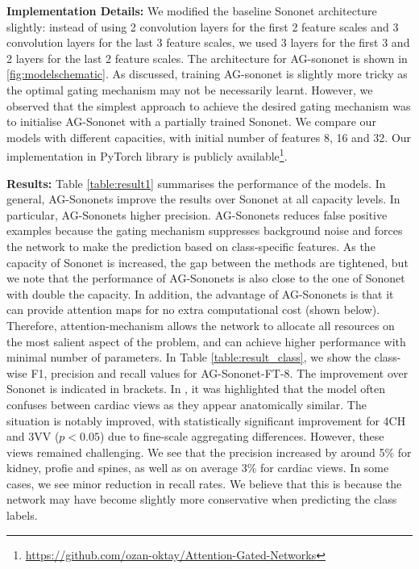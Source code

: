 \documentclass{article}
\begin{document}
\textbf{Implementation Details:} We modified the baseline Sononet architecture slightly: instead of using 2 convolution layers for the first 2 feature scales and 3 convolution layers for the last 3 feature scales, we used 3 layers for the first 3 and 2 layers for the last 2 feature scales. The architecture for AG-sononet is shown in \ref{fig:modelschematic}. As discussed, training AG-sononet is slightly more tricky as the optimal gating mechanism may not be necessarily learnt. However, we observed that the simplest approach to achieve the desired gating mechanism was to initialise AG-Sononet with a partially trained Sononet. We compare our models with different capacities, with initial number of features 8, 16 and 32. Our implementation in PyTorch library is publicly available\footnote{\url{https://github.com/ozan-oktay/Attention-Gated-Networks}}.

\textbf{Results:} Table \ref{table:result1} summarises the performance of the models. In general, AG-Sononets improve the results over Sononet at all capacity levels. In particular, AG-Sononets higher precision. AG-Sononets reduces false positive examples because the gating mechanism suppresses background noise and forces the network to make the prediction based on class-specific features.  As the capacity of Sononet is increased, the gap between the methods are tightened, but we note that the performance of AG-Sononets is also close to the one of Sononet with double the capacity. In addition, the advantage of AG-Sononets is that it can provide attention maps for no extra computational cost (shown below). Therefore, attention-mechanism allows the network to allocate all resources on the most salient aspect of the problem, and can achieve higher performance with minimal number of parameters. In Table \ref{table:result_class}, we show the class-wise F1, precision and recall values for AG-Sononet-FT-8. The improvement over Sononet is indicated in brackets. In \cite{baumgartner2016real}, it was highlighted that the model often confuses between cardiac views as they appear anatomically similar. The situation is notably improved, with statistically significant improvement for 4CH and 3VV ($p<0.05$) due to fine-scale aggregating differences. However, these views remained challenging. We see that the precision increased by around 5\% for kidney, profie and spines, as well as on average 3\% for cardiac views. In some cases, we see minor reduction in recall rates. We believe that this is because the network may have become slightly more conservative when predicting the class labels. 
\end{document}
